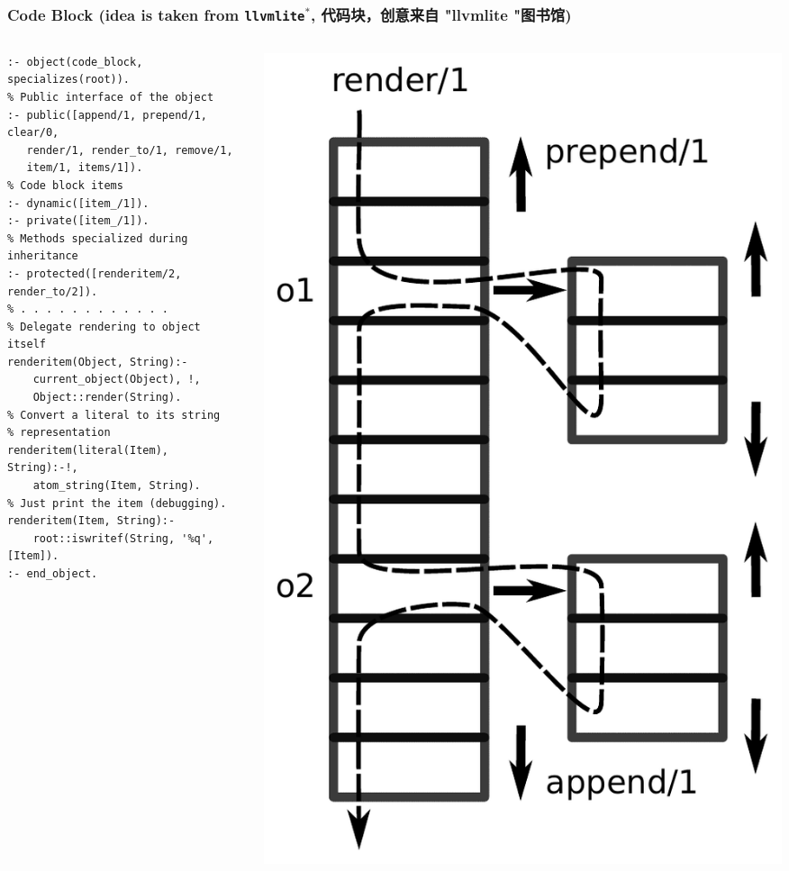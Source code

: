 \documentclass[10pt]{beamer}
\begin{document}
\begin{frame}[fragile]
  \frametitle{Code Block (idea is taken from \texttt{llvmlite}${}^*$, 代码块，创意来自 "llvmlite "图书馆)}
  \begin{columns}
    \begin{column}{0.6\textwidth}
      \flushleft
\begin{verbatim}
:- object(code_block, specializes(root)).
% Public interface of the object
:- public([append/1, prepend/1, clear/0,
   render/1, render_to/1, remove/1,
   item/1, items/1]).
% Code block items
:- dynamic([item_/1]).
:- private([item_/1]).
% Methods specialized during inheritance
:- protected([renderitem/2, render_to/2]).
% . . . . . . . . . . . .
% Delegate rendering to object itself
renderitem(Object, String):-
    current_object(Object), !,
    Object::render(String).
% Convert a literal to its string
% representation
renderitem(literal(Item), String):-!,
    atom_string(Item, String).
% Just print the item (debugging).
renderitem(Item, String):-
    root::iswritef(String, '%q', [Item]).
:- end_object.
\end{verbatim}
    \end{column}
    \begin{column}{0.4\textwidth}
      \includegraphics[width=1\linewidth]{code_block.pdf}

\end{column}
\end{columns}
\end{frame}
\end{document}
